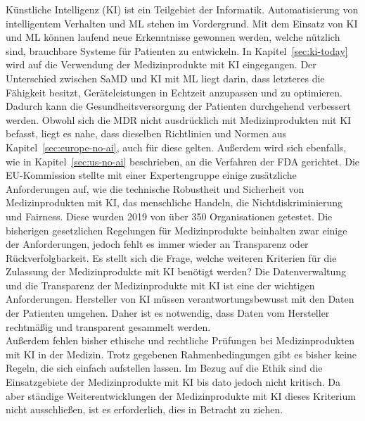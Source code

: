 Künstliche Intelligenz (KI) ist ein Teilgebiet der Informatik.
Automatisierung von intelligentem Verhalten und ML stehen im Vordergrund\cite{AI_in_EU}.
Mit dem Einsatz von KI und ML können laufend neue Erkenntnisse gewonnen werden,
welche nützlich sind, brauchbare Systeme für Patienten zu entwickeln\cite{AI_in_EU}.
In Kapitel~\ref{sec:ki-today} wird auf die Verwendung der Medizinprodukte mit KI eingegangen.
Der Unterschied zwischen SaMD und KI mit ML liegt darin, dass letzteres die Fähigkeit besitzt, 
Geräteleistungen in Echtzeit anzupassen und zu optimieren\cite{AI_in_EU}.
Dadurch kann die Gesundheitsversorgung der Patienten durchgehend verbessert werden. 
Obwohl sich die MDR nicht ausdrücklich mit Medizinprodukten mit KI befasst, 
liegt es nahe, dass dieselben Richtlinien und Normen aus Kapitel~\ref{sec:europe-no-ai},
auch für diese gelten. 
Außerdem wird sich ebenfalls, wie in Kapitel~\ref{sec:us-no-ai} beschrieben, an die Verfahren der FDA gerichtet. 
Die EU-Kommission stellte mit einer Expertengruppe einige zusätzliche Anforderungen auf, wie die technische Robustheit und Sicherheit von Medizinprodukten mit KI, das menschliche Handeln, 
die Nichtdiskriminierung und Fairness. 
Diese wurden 2019 von über 350 Organisationen getestet. 
Die bisherigen gesetzlichen Regelungen für Medizinprodukte beinhalten zwar einige der Anforderungen, 
jedoch fehlt es immer wieder an Transparenz oder Rückverfolgbarkeit\cite{whitepaper}.
Es stellt sich die Frage, welche weiteren Kriterien für die Zulassung der Medizinprodukte mit KI benötigt werden?
Die Datenverwaltung und die Transparenz der Medizinprodukte mit KI ist eine der wichtigen Anforderungen.
Hersteller von KI müssen verantwortungsbewusst mit den Daten der Patienten umgehen. 
Daher ist es notwendig, dass Daten vom Hersteller rechtmäßig und transparent gesammelt werden\cite{Lessons_Learned_about_ai}.\\
Außerdem fehlen bisher ethische und rechtliche Prüfungen bei Medizinprodukten mit KI in der Medizin. 
Trotz gegebenen Rahmenbedingungen gibt es bisher keine Regeln, die sich einfach aufstellen lassen.
Im Bezug auf die Ethik sind die Einsatzgebiete der Medizinprodukte mit KI bis dato jedoch nicht kritisch.
Da aber ständige Weiterentwicklungen der Medizinprodukte mit KI dieses Kriterium nicht ausschließen, ist es erforderlich, dies in Betracht zu ziehen.